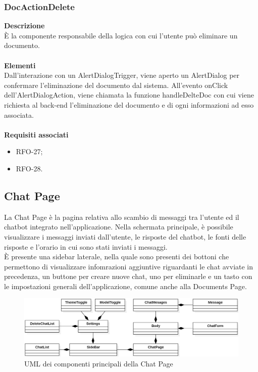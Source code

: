 \subsubsection{DocActionDelete}
\textbf{Descrizione}\\
È la componente responsabile della logica con cui l'utente può eliminare un documento.\\ \\
\textbf{Elementi}\\
Dall'interazione con un AlertDialogTrigger, viene aperto un AlertDialog per confermare l'eliminazione del documento dal sistema. All'evento onClick dell'AlertDialogAction, viene chiamata la funzione handleDelteDoc con cui viene richiesta al back-end l'eliminazione del documento e di ogni informazioni ad esso associata.\\ \\
\textbf{Requisiti associati}
\begin{itemize}
    \item RFO-27;
    \item RFO-28.
\end{itemize}



\newpage

\subsection{Chat Page}
La Chat Page è la pagina relativa allo scambio di messaggi tra l'utente ed il chatbot integrato nell'applicazione. Nella schermata principale, è possibile visualizzare i messaggi inviati dall'utente, le risposte del chatbot, le fonti delle risposte e l'orario in cui sono stati inviati i messaggi. \\
È presente una sidebar laterale, nella quale sono presenti dei bottoni che permettono di visualizzare infomrazioni aggiuntive riguardanti le chat avviate in precedenza, un buttone per creare nuove chat, uno per eliminarle e un tasto con le impostazioni generali dell'applicazione, comune anche alla Documents Page.
\begin{figure}[h!]
    \centering  
    \includegraphics[width=\textwidth]{ChatPageView.png}
    \caption{UML dei componenti principali della Chat Page} %
\end{figure}

